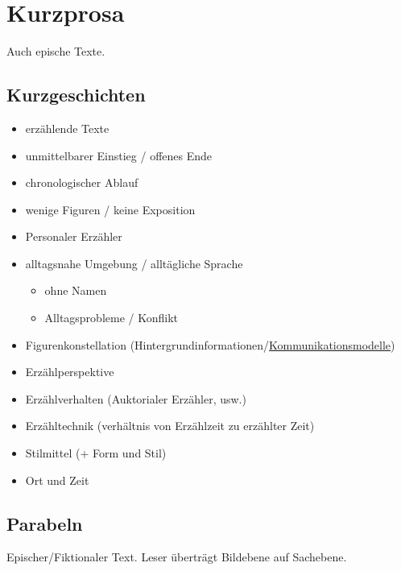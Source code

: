
\section{Kurzprosa}
Auch epische Texte.

\subsection{Kurzgeschichten}
\begin{itemize}
    \item erzählende Texte
    \item unmittelbarer Einstieg / offenes Ende
    \item chronologischer Ablauf
    \item wenige Figuren / keine Exposition
    \item Personaler Erzähler
    \item alltagsnahe Umgebung / alltägliche Sprache
    \begin{itemize}
        \item ohne Namen
        \item Alltagsprobleme / Konflikt
    \end{itemize}
\end{itemize}

\begin{itemize}
    \item Figurenkonstellation (Hintergrundinformationen/\hyperref[sec:kommunikationsmodelle]{Kommunikationsmodelle})
    \item Erzählperspektive
    \item Erzählverhalten (Auktorialer Erzähler, usw.)
    \item Erzähltechnik (verhältnis von Erzählzeit zu erzählter Zeit)
    \item Stilmittel (+ Form und Stil)
    \item Ort und Zeit
\end{itemize}


\subsection{Parabeln}

 Epischer/Fiktionaler Text. Leser überträgt Bildebene auf Sachebene.

